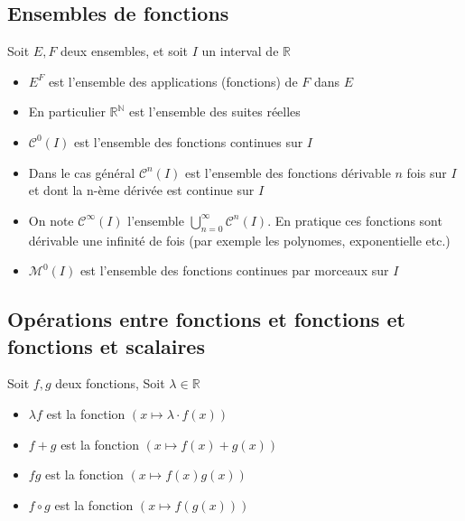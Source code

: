 \documentclass[11pt,colorlinks]{book}
\theoremstyle{mytheoremstyle}
\theoremstyle{mytheoremstyle}
\theoremstyle{mytheoremstyle}
\theoremstyle{mytheoremstyle}
\theoremstyle{mytheoremstyle}
\theoremstyle{mytheoremstyle}
\theoremstyle{mytheoremstyle}
\theoremstyle{mytheoremstyle}
\theoremstyle{myproblemstyle}
\def\mbb#1{\mathbb{#1}}
\def\bN{\mbb{N}}
\def\bR{\mbb{R}}
\def\mC{\mathcal{C}}
\def\mM{\mathcal{M}}
\def\rN{\bR^{\bN}}
\begin{document}
\subsection{Ensembles de fonctions}
\begin{rmq}
  Soit $E,F$ deux ensembles, et soit $I$ un interval de $\bR$
  \begin{itemize}
    \item $E^{F}$ est l'ensemble des applications (fonctions) de $F$ dans $E$
    \item En particulier $\rN$ est l'ensemble des suites réelles
    \item $\mC^0(I)$ est l'ensemble des fonctions continues sur $I$
    \item Dans le cas général $\mC^n(I)$ est l'ensemble des fonctions dérivable $n$ fois sur $I$ et 
    dont la n-ème dérivée est continue sur $I$
    \item On note $\mC^{\infty}(I)$ l'ensemble $\bigcup_{n=0}^{\infty} \mC^n(I)$. En pratique ces fonctions 
    sont dérivable une infinité de fois (par exemple les polynomes, exponentielle etc.)
    \item $\mM^0(I)$ est l'ensemble des fonctions continues par morceaux sur $I$
  \end{itemize}
\end{rmq}
\subsection{Opérations entre fonctions et fonctions et fonctions et scalaires}
\begin{rmq}
  Soit $f,g$ deux fonctions, Soit $\lambda \in \bR$
  \begin{itemize}
    \item $\lambda f$ est la fonction $\left(x \mapsto \lambda \cdot f(x)\right)$
    \item $f+g$ est la fonction $\left(x \mapsto f(x)+g(x)\right)$
    \item $fg$ est la fonction $\left(x \mapsto f(x)g(x)\right)$
    \item $f \circ g$ est la fonction $\left(x \mapsto f(g(x))\right)$
  \end{itemize}
\end{rmq}
\end{document}
